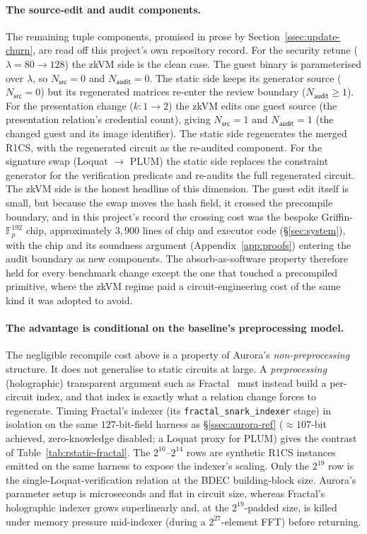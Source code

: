 \paragraph{The source-edit and audit components.}
The remaining tuple components, promised in prose by Section~\ref{ssec:update-churn}, are read off this project's own repository record. For the security retune ($\lambda=80\to128$) the zkVM side is the clean case. The guest binary is parameterised over $\lambda$, so $N_{\mathsf{src}}=0$ and $N_{\mathsf{audit}}=0$. The static side keeps its generator source ($N_{\mathsf{src}}=0$) but its regenerated matrices re-enter the review boundary ($N_{\mathsf{audit}}\ge 1$). For the presentation change ($k{:}1\to2$) the zkVM edits one guest source (the presentation relation's credential count), giving $N_{\mathsf{src}}=1$ and $N_{\mathsf{audit}}=1$ (the changed guest and its image identifier). The static side regenerates the merged R1CS, with the regenerated circuit as the re-audited component. For the signature swap (Loquat $\to$ PLUM) the static side replaces the constraint generator for the verification predicate and re-audits the full regenerated circuit. The zkVM side is the honest headline of this dimension. The guest edit itself is small, but because the swap moves the hash field, it crossed the precompile boundary, and in this project's record the crossing cost was the bespoke Griffin-$\mathbb{F}_p^{192}$ chip, approximately $3{,}900$ lines of chip and executor code (\S\ref{sec:system}), with the chip and its soundness argument (Appendix~\ref{app:proofs}) entering the audit boundary as new components. The absorb-as-software property therefore held for every benchmark change except the one that touched a precompiled primitive, where the zkVM regime paid a circuit-engineering cost of the same kind it was adopted to avoid.

\paragraph{The advantage is conditional on the baseline's preprocessing model.}
The negligible recompile cost above is a property of Aurora's \emph{non-preprocessing} structure. It does not generalise to static circuits at large. A \emph{preprocessing} (holographic) transparent argument such as Fractal~\cite{cryptoeprint:2019/1076} must instead build a per-circuit index, and that index is exactly what a relation change forces to regenerate. Timing Fractal's indexer (its \texttt{fractal\_snark\_indexer} stage) in isolation on the same $127$-bit-field harness as \S\ref{ssec:aurora-ref} (${\approx}107$-bit achieved, zero-knowledge disabled; a Loquat proxy for PLUM) gives the contrast of Table~\ref{tab:rstatic-fractal}. The $2^{10}$--$2^{14}$ rows are synthetic R1CS instances emitted on the same harness to expose the indexer's scaling. Only the $2^{19}$ row is the single-Loquat-verification relation at the BDEC building-block size. Aurora's parameter setup is microseconds and flat in circuit size, whereas Fractal's holographic indexer grows superlinearly and, at the $2^{19}$-padded size, is killed under memory pressure mid-indexer (during a $2^{27}$-element FFT) before returning.

